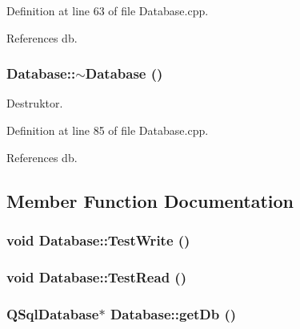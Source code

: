 Definition at line 63 of file Database.cpp.

References db.\hypertarget{class_database_84d399a2ad58d69daab9b05330e1316d}{
\subsubsection[$\sim$Database]{\setlength{\rightskip}{0pt plus 5cm}Database::$\sim$Database ()}}
\label{class_database_84d399a2ad58d69daab9b05330e1316d}


Destruktor. 



Definition at line 85 of file Database.cpp.

References db.

\subsection{Member Function Documentation}
\hypertarget{class_database_e2ef309eea700ffc9c6339b6cb6ee37c}{
\subsubsection[TestWrite]{\setlength{\rightskip}{0pt plus 5cm}void Database::TestWrite ()}}
\label{class_database_e2ef309eea700ffc9c6339b6cb6ee37c}


\hypertarget{class_database_d399b899bae6d747b8cb0108f1cb188b}{
\subsubsection[TestRead]{\setlength{\rightskip}{0pt plus 5cm}void Database::TestRead ()}}
\label{class_database_d399b899bae6d747b8cb0108f1cb188b}


\hypertarget{class_database_b480eca23d1bf71206cab822da9b0246}{
\subsubsection[getDb]{\setlength{\rightskip}{0pt plus 5cm}QSqlDatabase$\ast$ Database::getDb ()}}
\label{class_database_b480eca23d1bf71206cab822da9b0246}




